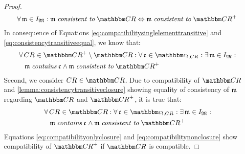 \begin{proof}
\begin{align}
        \forall \modeltuple{m} \in \metamodeltupleinstanceset{M}: \modeltuple{m} \consistenttomath \consistencyrelationset{CR} \equivalent \modeltuple{m} \consistenttomath \transitiveclosure{\consistencyrelationset{CR}}
    \end{align}
    In consequence of Equations \ref{eq:compatibilitysinglelementtransitive} and \ref{eq:consistencytransitiveequal}, we know that:
    \begin{align}
        & \nonumber \label{eq:compatibilityonlyclosure}
        \forall \consistencyrelation{CR}{} \in \transitiveclosure{\consistencyrelationset{CR}} \setminus \consistencyrelationset{CR} : \forall \conditionelement{c}{} \in \condition{c}{l, \consistencyrelation{CR}{}}
        : \exists \modeltuple{m} \in \metamodeltupleinstanceset{M} : \\
        & \formulaskip
        \modeltuple{m} \containsmath \conditionelement{c}{} \land \modeltuple{m} \consistenttomath \transitiveclosure{\consistencyrelationset{CR}}
    \end{align}
    Second, we consider $\consistencyrelation{CR}{} \in \consistencyrelationset{CR}$.
    Due to compatibility of $\consistencyrelationset{CR}$ and \autoref{lemma:consistencytransitiveclosure} showing equality of consistency of $\modeltuple{m}$ regarding $\consistencyrelationset{CR}$ and $\transitiveclosure{\consistencyrelationset{CR}}$, it is true that:
    \begin{align}
        & \nonumber \label{eq:compatibilitynonclosure}
        \forall \consistencyrelation{CR}{} \in \consistencyrelationset{CR} : \forall \conditionelement{c}{} \in \condition{c}{l, \consistencyrelation{CR}{}}
        : \exists \modeltuple{m} \in \metamodeltupleinstanceset{M} : \\
        & \formulaskip
        \modeltuple{m} \containsmath \conditionelement{c}{} \land \modeltuple{m} \consistenttomath \transitiveclosure{\consistencyrelationset{CR}}
    \end{align}
    Equations \ref{eq:compatibilityonlyclosure} and \ref{eq:compatibilitynonclosure} show compatibility of $\transitiveclosure{\consistencyrelationset{CR}}$ if $\consistencyrelationset{CR}$ is compatible.
\end{proof}
